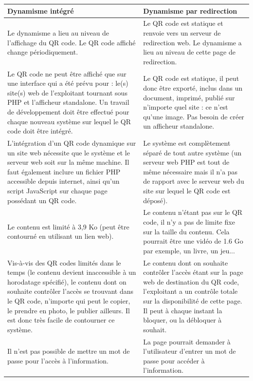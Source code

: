 \documentclass[a4paper,12pt]{article}
\begin{document}
    \noindent\begin{longtable}{ | m{} | m{} | } 
    \hline
    \textbf{Dynamisme intégré} & \textbf{Dynamisme par redirection} \\ 
    \hline
    Le dynamisme a lieu au niveau de l’affichage du QR code. Le QR code affiché change périodiquement. & Le QR code est statique et renvoie vers un serveur de redirection web. Le dynamisme a lieu au niveau de cette page de redirection.\\
    \hline
    Le QR code ne peut être affiché que sur une interface qui a été prévu pour : le(s) site(s) web de l'exploitant tournant sous PHP et l'afficheur standalone. Un travail de développement doit être effectué pour chaque nouveau système sur lequel le QR code doit être intégré. & Le QR code est statique, il peut donc être exporté, inclus dans un document, imprimé, publié sur n'importe quel site : ce n'est qu'une image. Pas besoin de créer un afficheur standalone.\\
    \hline
    L'intégration d'un QR code dynamique sur un site web nécessite que le système et le serveur web soit sur la même machine. Il faut également inclure un fichier PHP accessible depuis internet, ainsi qu'un script JavaScript sur chaque page possédant un QR code. & Le système est complètement séparé de tout autre système (un serveur web PHP est tout de même nécessaire mais il n'a pas de rapport avec le serveur web du site sur lequel le QR code est déposé).\\
    \hline
    Le contenu est limité à 3,9 Ko (peut être contourné en utilisant un lien web). & Le contenu n'étant pas sur le QR code, il n'y a pas de limite fixe sur la taille du contenu. Cela pourrait être une vidéo de 1.6 Go par exemple, un livre, un jeu...\\
    \hline
    Vis-à-vis des QR codes limités dans le temps (le contenu devient inaccessible à un horodatage spécifié), le contenu dont on souhaite contrôler l'accès se trouvant dans le QR code, n'importe qui peut le copier, le prendre en photo, le publier ailleurs. Il est donc très facile de contourner ce système. & Le contenu dont on souhaite contrôler l'accès étant sur la page web de destination du QR code, l'exploitant a un contrôle totale sur la disponibilité de cette page. Il peut à chaque instant la bloquer, ou la débloquer à souhait.\\
    \hline
    Il n'est pas possible de mettre un mot de passe pour l'accès à l'information. & La page pourrait demander à l'utilisateur d'entrer un mot de passe pour accéder à l'information.\\

\end{longtable}
\end{document}
